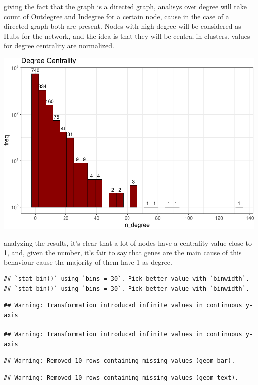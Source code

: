 \documentclass[
]{article}
\begin{document}
giving the fact that the graph is a directed graph, analisys over degree will take count of Outdegree and Indegree for a certain node, cause in the case of a directed graph both are present. Nodes with high degree will be considered as Hubs for the network, and the idea is that they will be central in clusters. values for degree centrality are normalized.

\includegraphics{HumanDiseaseNetwork_files/figure-latex/unnamed-chunk-4-1.pdf}

analyzing the results, it's clear that a lot of nodes have a centrality value close to 1, and, given the number, it's fair to say that genes are the main cause of this behaviour cause the majority of them have 1 as degree.

\begin{verbatim}
## `stat_bin()` using `bins = 30`. Pick better value with `binwidth`.
## `stat_bin()` using `bins = 30`. Pick better value with `binwidth`.
\end{verbatim}

\begin{verbatim}
## Warning: Transformation introduced infinite values in continuous y-axis

## Warning: Transformation introduced infinite values in continuous y-axis
\end{verbatim}

\begin{verbatim}
## Warning: Removed 10 rows containing missing values (geom_bar).
\end{verbatim}

\begin{verbatim}
## Warning: Removed 10 rows containing missing values (geom_text).
\end{verbatim}
\end{document}
